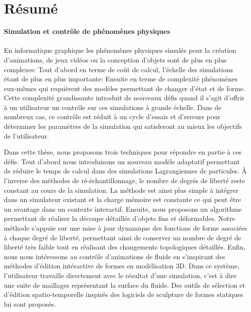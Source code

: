 \chapter{R\'esum\'e}

\textbf{\Large{Simulation et contrôle de phénomènes physiques}}
\\
\\
En informatique graphique les phénomènes physiques simulés pour la création d'animations, de jeux vidéos ou la conception d'objets sont de plus en plus complexes: 
Tout d'abord en terme de coût de calcul, l'échelle des simulations étant de plus en plus importante; 
Ensuite en terme de complexité phénomènes eux-mêmes qui requièrent des modèles permettant de changer d'état et de forme. 
Cette complexité grandissante introduit de nouveaux défis quand il s'agit d'offrir à un utilisateur un contrôle sur ces simulations à grande échelle. 
Dans de nombreux cas, ce contrôle est réduit à un cycle d'essais et d'erreurs pour déterminer les paramètres de la simulation qui satisferont au mieux les objectifs de l'utilisateur.

Dans cette thèse, nous proposons trois techniques pour répondre en partie à ces défis. 
Tout d'abord nous introduisons un nouveau modèle adaptatif permettant de réduire le temps de calcul dans des simulations Lagrangiennes de particules. 
À l'inverse des méthodes de ré-échantillonnage, le nombre de degrés de liberté reste constant au cours de la simulation. 
La méthode est ainsi plus simple à intégrer dans un simulateur existant et la charge mémoire est constante ce qui peut être un avantage dans un contexte interactif. 
Ensuite, nous proposons un algorithme permettant de réaliser la découpe détaillée d'objets fins et déformables. 
Notre méthode s'appuie sur une mise à jour dynamique des fonctions de forme associées à chaque degré de liberté, permettant ainsi de conserver un nombre de degré de liberté très faible tout en réalisant des changements topologiques détaillés. 
Enfin, nous nous intéressons au contrôle d'animations de fluide en s'inspirant des méthodes d'édition intéractive de formes en modélisation 3D. 
Dans ce système, l'utilisateur travaille directement avec le résultat d'une simulation, c'est à dire une suite de maillages représentant la surface du fluide. 
Des outils de sélection et d'édition spatio-temporelle inspirés des logiciels de sculpture de formes statiques lui sont proposés.
